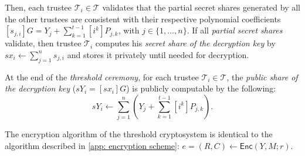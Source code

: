 Then, each trustee $\mathcal{T}_i \in \boldsymbol{\mathcal{T}}$ validates that the partial secret shares generated by all the other trustees are consistent with their respective polynomial coefficients $[s_{j, i}]G = Y_j + \sum_{k=1}^{t-1} [i^k] P_{j, k}$, with $j \in \{ 1, ..., n \}$. If all \textit{partial secret shares} validate, then trustee $\mathcal{T}_i$ computes his \textit{secret share of the decryption key} by $sx_i \gets \sum_{j=1}^n s_{j, i}$ and stores it privately until needed for decryption.

At the end of the \textit{threshold ceremony}, for each trustee $\mathcal{T}_i \in \boldsymbol{\mathcal{T}}$, the \textit{public share of the decryption key} ($sY_i = [sx_i]G$) is publicly computable by the following:
\[
sY_i \gets \sum\limits_{j=1}^{n} (Y_j + \sum\limits_{k=1}^{t-1} [i^k]P_{j, k}).
\]

The encryption algorithm of the threshold cryptosystem is identical to the algorithm described in \cref{app: encryption scheme}: $e = (R, C) \gets \mathsf{Enc}(Y, M; r)$.


